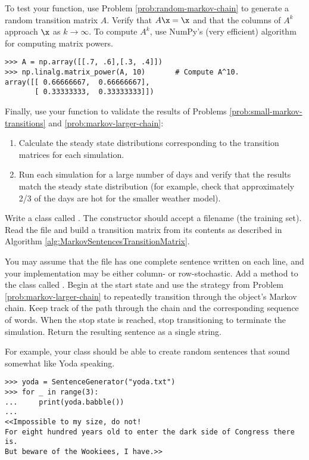 To test your function, use Problem \ref{prob:random-markov-chain} to generate a random transition matrix $A$.
Verify that $A\x = \x$ and that the columns of $A^k$ approach $\x$ as $k\rightarrow\infty$.
To compute $A^k$, use NumPy's (very efficient) algorithm for computing matrix powers. %

\begin{lstlisting}
>>> A = np.array([[.7, .6],[.3, .4]])
>>> np.linalg.matrix_power(A, 10)       # Compute A^10.
array([[ 0.66666667,  0.66666667],
       [ 0.33333333,  0.33333333]])
\end{lstlisting}

Finally, use your function to validate the results of Problems \ref{prob:small-markov-transitions} and \ref{prob:markov-larger-chain}:
\begin{enumerate}
    \item Calculate the steady state distributions corresponding to the transition matrices for each simulation.
    \item Run each simulation for a large number of days and verify that the results match the steady state distribution (for example, check that approximately 2/3 of the days are hot for the smaller weather model).
\end{enumerate}

\label{prob:markov-power-method}
Write a class called .
The constructor should accept a filename (the training set).
Read the file and build a transition matrix from its contents as described in Algorithm \ref{alg:MarkovSentencesTransitionMatrix}.

You may assume that the file has one complete sentence written on each line, and your implementation may be either column- or row-stochastic.
\label{problem:markov-random-sentences-init}
Add a method to the  class called .
Begin at the start state and use the strategy from Problem \ref{prob:markov-larger-chain} to repeatedly transition through the object's Markov chain.
Keep track of the path through the chain and the corresponding sequence of words.
When the stop state is reached, stop transitioning to terminate the simulation.
Return the resulting sentence as a single string.

For example, your  class should be able to create random sentences that sound somewhat like Yoda speaking.

\begin{lstlisting}
>>> yoda = SentenceGenerator("yoda.txt")
>>> for _ in range(3):
... 	print(yoda.babble())
...
<<Impossible to my size, do not!
For eight hundred years old to enter the dark side of Congress there is.
But beware of the Wookiees, I have.>>
\end{lstlisting}

\label{prob:markov-random-sentences-babble}

